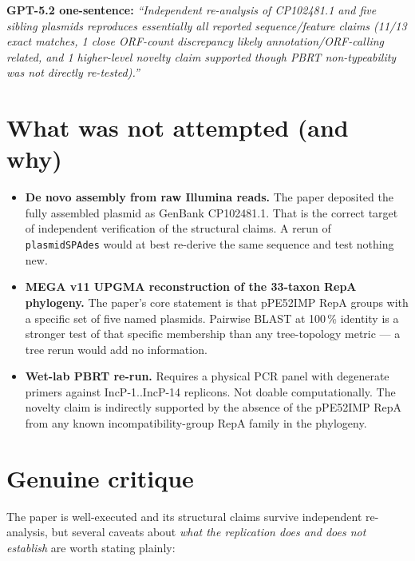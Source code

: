 \documentclass[11pt]{article}
\begin{document}
\textbf{GPT-5.2 one-sentence:} \textit{``Independent re-analysis of CP102481.1 and five
sibling plasmids reproduces essentially all reported sequence/feature claims (11/13
exact matches, 1 close ORF-count discrepancy likely annotation/ORF-calling related, and
1 higher-level novelty claim supported though PBRT non-typeability was not directly
re-tested).''}

\section{What was not attempted (and why)}
\begin{itemize}[leftmargin=1.2em]
  \item \textbf{De novo assembly from raw Illumina reads.} The paper deposited the fully
        assembled plasmid as GenBank CP102481.1. That is the correct target of independent
        verification of the structural claims. A rerun of \texttt{plasmidSPAdes} would at
        best re-derive the same sequence and test nothing new.
  \item \textbf{MEGA v11 UPGMA reconstruction of the 33-taxon RepA phylogeny.} The paper's
        core statement is that pPE52IMP RepA groups with a specific set of five named
        plasmids. Pairwise BLAST at 100\,\% identity is a stronger test of that specific
        membership than any tree-topology metric --- a tree rerun would add no information.
  \item \textbf{Wet-lab PBRT re-run.} Requires a physical PCR panel with degenerate primers
        against IncP-1..IncP-14 replicons. Not doable computationally. The novelty claim is
        indirectly supported by the absence of the pPE52IMP RepA from any known
        incompatibility-group RepA family in the phylogeny.
\end{itemize}

\section{Genuine critique}
\label{sec:critique}
The paper is well-executed and its structural claims survive independent re-analysis, but
several caveats about \emph{what the replication does and does not establish} are worth
stating plainly:
\end{document}
